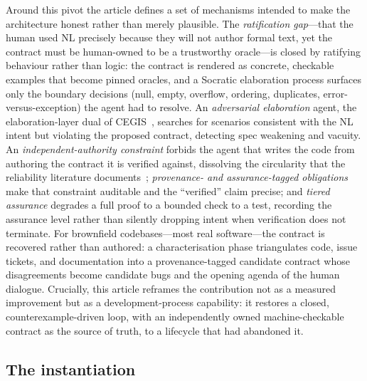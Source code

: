 Around this pivot the article defines a set of mechanisms intended to make the architecture honest rather than merely plausible. The \emph{ratification gap}---that the human used NL precisely because they will not author formal text, yet the contract must be human-owned to be a trustworthy oracle---is closed by ratifying behaviour rather than logic: the contract is rendered as concrete, checkable examples that become pinned oracles, and a Socratic elaboration process surfaces only the boundary decisions (null, empty, overflow, ordering, duplicates, error-versus-exception) the agent had to resolve. An \emph{adversarial elaboration} agent, the elaboration-layer dual of CEGIS~\cite{solarlezama2008sketching}, searches for scenarios consistent with the NL intent but violating the proposed contract, detecting spec weakening and vacuity. An \emph{independent-authority constraint} forbids the agent that writes the code from authoring the contract it is verified against, dissolving the circularity that the reliability literature documents~\cite{liu2023evalplus,zhang2025hallucination,liu2026oracle}; \emph{provenance- and assurance-tagged obligations} make that constraint auditable and the ``verified'' claim precise; and \emph{tiered assurance} degrades a full proof to a bounded check to a test, recording the assurance level rather than silently dropping intent when verification does not terminate. For brownfield codebases---most real software---the contract is recovered rather than authored: a characterisation phase triangulates code, issue tickets, and documentation into a provenance-tagged candidate contract whose disagreements become candidate bugs and the opening agenda of the human dialogue. Crucially, this article reframes the contribution not as a measured improvement but as a development-process capability: it restores a closed, counterexample-driven loop, with an independently owned machine-checkable contract as the source of truth, to a lifecycle that had abandoned it.

\subsection{The instantiation}
\label{subsec:conclusion-instantiation}

